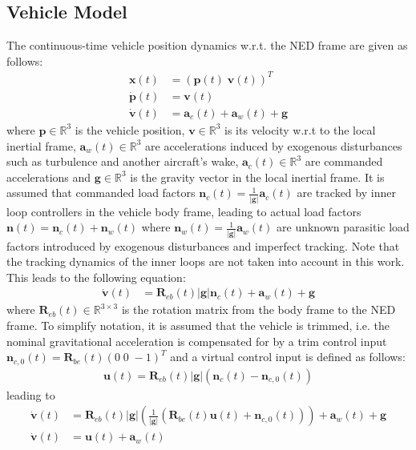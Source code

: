 \documentclass{ifacconf}
\providecommand{\mbf}[1]{\mathbf{#1}}
\begin{document}
\subsection{Vehicle Model}
The continuous-time vehicle position dynamics w.r.t. the NED frame are given as follows:
\begin{align}
\mathbf{x}(t) &= (\mbf{p}(t) \; \mbf{v}(t))^T \\
\dot{\mathbf{p}}(t) &= \mbf{v}(t)\\
\dot{\mbf{v}}(t) &= \mbf{a}_{c}(t) + \mbf{a}_w(t) + \mbf{g}
\end{align}
where $\mbf{p} \in \mathbb{R}^3$ is the vehicle position, $\mbf{v} \in \mathbb{R}^3$ is its velocity w.r.t to the local inertial frame, $\mbf{a}_w(t) \in \mathbb{R}^3$ are accelerations induced by exogenous disturbances such as turbulence and another aircraft's wake, $\mbf{a}_{c}(t) \in \mathbb{R}^3$ are commanded accelerations and $\mbf{g} \in \mathbb{R}^3$ is the gravity vector in the local inertial frame.
It is assumed that commanded load factors $\mbf{n}_c(t) = \frac{1}{|\mbf{g}|} \mbf{a}_c(t)$ are tracked by inner loop controllers in the vehicle body frame, leading to actual load factors $\mbf{n}(t) = \mbf{n}_c(t) + \mbf{n}_w(t)$ where $\mbf{n}_w(t) = \frac{1}{|\mbf{g}|} \mbf{a}_w(t)$ are unknown parasitic load factors introduced by exogenous disturbances and imperfect tracking. Note that the tracking dynamics of the inner loops are not taken into account in this work. This leads to the following equation:
\begin{align}
\dot{\mbf{v}}(t) &= \mbf{R}_{eb}(t) |\mbf{g}|\mbf{n}_c(t) + \mbf{a}_w(t) + \mbf{g}
\label{eq:svmloadfactorlevel}
\end{align}
where $\mbf{R}_{eb}(t) \in \mathbb{R}^{3 \times 3}$ is the rotation matrix from the body frame to the NED frame. To simplify notation, it is assumed that the vehicle is trimmed, i.e. the nominal gravitational acceleration is compensated for by a trim control input $\mbf{n}_{c,0}(t) = \mbf{R}_{be}(t)(0 \; 0 \; -1)^{T}$ and a virtual control input is defined as follows:
\begin{align}
\mbf{u} (t)= \mbf{R}_{eb}(t) |\mbf{g}|(\mbf{n}_c(t) - \mbf{n}_{c,0}(t))	
\label{eq:defushort}
\end{align}
leading to
\begin{align}
\dot{\mbf{v}}(t) &= \mbf{R}_{eb}(t)|\mbf{g}|
(
\frac{1}{|\mbf{g}|}
(\mbf{R}_{be}(t) \mbf{u}(t) + \mbf{n}_{c,0}(t))
) + \mbf{a}_w(t) + \mbf{g}\\
\dot{\mbf{v}}(t) &= \mbf{u}(t) + \mbf{a}_w(t)
\label{eq:svmshort}
\end{align}
\end{document}

